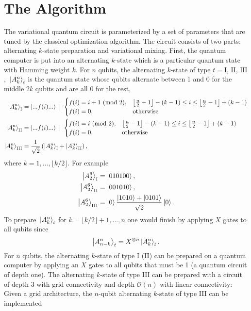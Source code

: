 \documentclass[Dual]{msu-thesis}
\begin{document}
\section{The Algorithm}
The variational quantum circuit is parameterized by a set of parameters that are tuned by the classical optimization algorithm. The circuit consists of two parts: alternating $k$-state preparation and variational mixing. First, the quantum computer is put into an alternating $k$-state which is a particular quantum state with Hamming weight $k$. For $n$ qubits, the alternating $k$-state of type $t=\text{I, II, III}$, $\ket*{A^n_k}_{t}$ is the quantum state whose qubits alternate between 1 and 0 for the middle $2k$ qubits and are all 0 for the rest,
\begin{align}
\ket{A^n_k}_\text{I} &= \ket{...f(i)...} \ | \  \begin{cases}
f(i)= i+1 \ (\text{mod} \  2), & \left\lfloor\frac{n}{2}-1\right\rfloor - (k-1) \leq i \leq \left\lfloor\frac{n}{2}-1\right\rfloor + (k-1)
\\
f(i)= 0, & \text{otherwise}
\end{cases}
\\
\ket{A^n_k}_\text{II} &= \ket{...f(i)...} \ | \  \begin{cases}
f(i)= i \ (\text{mod} \  2), & \left\lfloor\frac{n}{2}-1\right\rfloor - (k-1) \leq i \leq \left\lfloor\frac{n}{2}-1\right\rfloor + (k-1)
\\
f(i)= 0, & \text{otherwise}
\end{cases}
\\
\ket{A^n_k}_\text{III} &= \frac{1}{\sqrt{2}}\left(\ket{A^n_k}_\text{I}+ \ket{A^n_k}_\text{II}\right)
,\end{align}
where $k=1,...,\lfloor k/2 \rfloor$.
For example
\begin{align}
\ket{A^6_2}_\text{I} &= \ket{010100},
\\
\ket{A^6_2}_\text{II} &= \ket{001010},
\\
\ket{A^6_2}_\text{III} &= \ket{0}\frac{\ket{1010}+\ket{0101}}{\sqrt{2}}\ket{0}
.\end{align}
To prepare $\ket*{A^n_k}_t$ for $k=\lfloor k/2 \rfloor+1,...,n$ one would finish by applying $X$ gates to all qubits since
\begin{align}
\ket{A^n_{n-k}}_t=X^{\otimes n}\ket{A^n_k}_t
.\end{align}
For $n$ qubits, the alternating $k$-state of type I (II) can be prepared on a quantum computer by applying an $X$ gates to all qubits that must be 1 (a quantum circuit of depth one). The alternating $k$-state of type III can be prepared with a circuit of depth $3$ with grid connectivity and depth $\mathcal{O}(n)$ with linear connectivity: Given a grid architecture, the $n$-qubit alternating $k$-state of type III can be implemented
\end{document}
